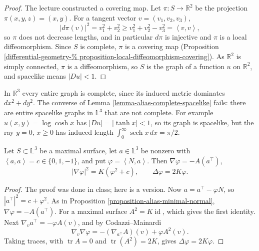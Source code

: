 \begin{proof}
The lecture constructed a covering map.
Let $\pi:S\to\mathbb{R}^2$ be the
projection $\pi(x,y,z)=(x,y)$. For a
tangent vector $v=(v_1,v_2,v_3)$,
$$
|d\pi(v)|^2=v_1^2+v_2^2
\geq v_1^2+v_2^2-v_3^2
=\left\langle{} v,v\right\rangle{},
$$
so $\pi$ does not decrease lengths, and in
particular $d\pi$ is injective and $\pi$ is
a local diffeomorphism. Since $S$ is
complete, $\pi$ is a covering map
(Proposition
\ref{differential-geometry-%
proposition-local-diffeomorphism-covering}).
As $\mathbb{R}^2$ is simply connected,
$\pi$ is a diffeomorphism, so $S$ is the
graph of a function $u$ on
$\mathbb{R}^2$, and spacelike means
$|Du|<1$.
\end{proof}

\begin{remark}
\label{remark-alias-entire-graphs}
In $\mathbb{R}^3$ every entire graph is
complete, since its induced metric
dominates $dx^2+dy^2$. The converse of
Lemma \ref{lemma-alias-complete-spacelike}
fails: there are entire spacelike graphs
in $\mathbb{L}^3$ that are not complete.
For example $u(x,y)=\log\cosh x$ has
$|Du|=|\tanh x|<1$, so its graph is
spacelike, but the ray $y=0$, $x\geq 0$
has induced length
$\int_0^\infty\operatorname{sech}x\,dx
=\pi/2$.
\end{remark}

\begin{proposition}
\label{proposition-alias-maximal-normal}
Let $S\subset\mathbb{L}^3$ be a maximal
surface, let $a\in\mathbb{L}^3$ be
nonzero with
$\left\langle{} a,a\right\rangle{}=c\in
\{0,1,-1\}$, and put
$\varphi=\left\langle{} N,a
\right\rangle{}$. Then
$\nabla\varphi=-A(a^{\top})$,
$$
|\nabla\varphi|^2=K(\varphi^2+c),
\qquad
\Delta\varphi=2K\varphi.
$$
\end{proposition}

\begin{proof}
The proof was done in class; here is a
version. Now $a=a^{\top}-\varphi N$, so
$|a^{\top}|^2=c+\varphi^2$. As in
Proposition
\ref{proposition-alias-minimal-normal},
$\nabla\varphi=-A(a^{\top})$. For a
maximal surface $A^2=K\operatorname{id}$,
which gives the first identity. Next
$\nabla_va^{\top}=-\varphi A(v)$, and by
Codazzi--Mainardi
$$
\nabla_v\nabla\varphi
=-(\nabla_{a^{\top}}A)(v)
+\varphi A^2(v).
$$
Taking traces, with
$\operatorname{tr}A=0$ and
$\operatorname{tr}(A^2)=2K$, gives
$\Delta\varphi=2K\varphi$.
\end{proof}


